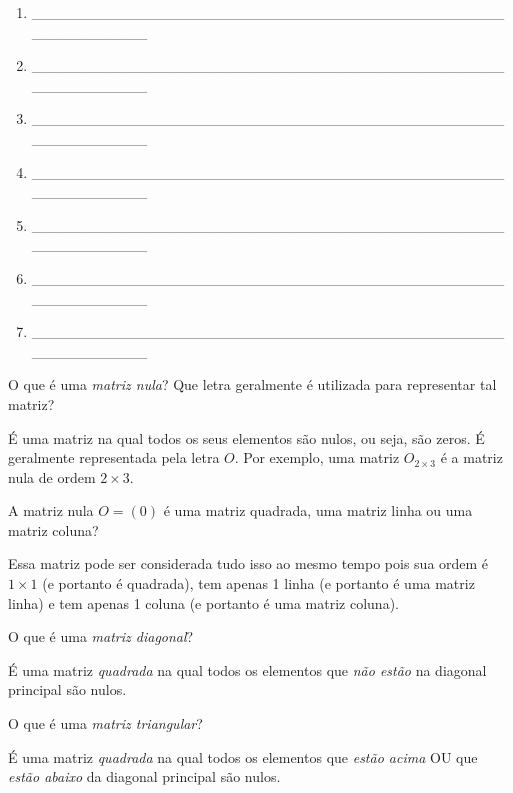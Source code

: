 \documentclass[pdftex, brazil, 12pt, oneside, addpoints]{exam}
\begin{document}
\begin{questions}
\begin{enumerate}
  \item \_\_\_\_\_\_\_\_\_\_\_\_\_\_\_\_\_\_\_\_\_\_\_\_\_\_\_\_\_\_\_\_\_\_\_\_\_\_\_\_\_\_\_\_\_\_\_\_\_\_\_\_\_\_\_\_
  \item \_\_\_\_\_\_\_\_\_\_\_\_\_\_\_\_\_\_\_\_\_\_\_\_\_\_\_\_\_\_\_\_\_\_\_\_\_\_\_\_\_\_\_\_\_\_\_\_\_\_\_\_\_\_\_\_
  \item \_\_\_\_\_\_\_\_\_\_\_\_\_\_\_\_\_\_\_\_\_\_\_\_\_\_\_\_\_\_\_\_\_\_\_\_\_\_\_\_\_\_\_\_\_\_\_\_\_\_\_\_\_\_\_\_
  \item \_\_\_\_\_\_\_\_\_\_\_\_\_\_\_\_\_\_\_\_\_\_\_\_\_\_\_\_\_\_\_\_\_\_\_\_\_\_\_\_\_\_\_\_\_\_\_\_\_\_\_\_\_\_\_\_
  \item \_\_\_\_\_\_\_\_\_\_\_\_\_\_\_\_\_\_\_\_\_\_\_\_\_\_\_\_\_\_\_\_\_\_\_\_\_\_\_\_\_\_\_\_\_\_\_\_\_\_\_\_\_\_\_\_
  \item \_\_\_\_\_\_\_\_\_\_\_\_\_\_\_\_\_\_\_\_\_\_\_\_\_\_\_\_\_\_\_\_\_\_\_\_\_\_\_\_\_\_\_\_\_\_\_\_\_\_\_\_\_\_\_\_
  \item \_\_\_\_\_\_\_\_\_\_\_\_\_\_\_\_\_\_\_\_\_\_\_\_\_\_\_\_\_\_\_\_\_\_\_\_\_\_\_\_\_\_\_\_\_\_\_\_\_\_\_\_\_\_\_\_    
\end{enumerate}
\fi

\question
O que é uma \emph{matriz nula}? Que letra geralmente é utilizada para representar tal matriz?
\begin{solutionorlines}[0.50in]
  É uma matriz na qual todos os seus elementos são nulos, ou seja, são zeros. É geralmente
  representada pela letra $O$. Por exemplo, uma matriz $O_{2 \times 3}$ é a matriz nula
  de ordem $2 \times 3$.
\end{solutionorlines}

\question
A matriz nula $O = (0)$ é uma matriz quadrada, uma matriz linha ou uma matriz coluna?
\begin{solutionorlines}[0.50in]
  Essa matriz pode ser considerada tudo isso ao mesmo tempo pois sua ordem é $1 \times 1$
  (e portanto é quadrada), tem apenas 1 linha (e portanto é uma matriz linha) e tem apenas
  1 coluna (e portanto é uma matriz coluna).
\end{solutionorlines}

\question
O que é uma \emph{matriz diagonal}?
\begin{solutionorlines}[0.50in]
  É uma matriz \emph{quadrada} na qual todos os elementos que \emph{não estão}
  na diagonal principal são nulos.
\end{solutionorlines}

\question
O que é uma \emph{matriz triangular}?
\begin{solutionorlines}[0.50in]
  É uma matriz \emph{quadrada} na qual todos os elementos que \emph{estão acima}
  OU que \emph{estão abaixo} da diagonal principal são nulos.
\end{solutionorlines}


\end{questions}
\end{document}
